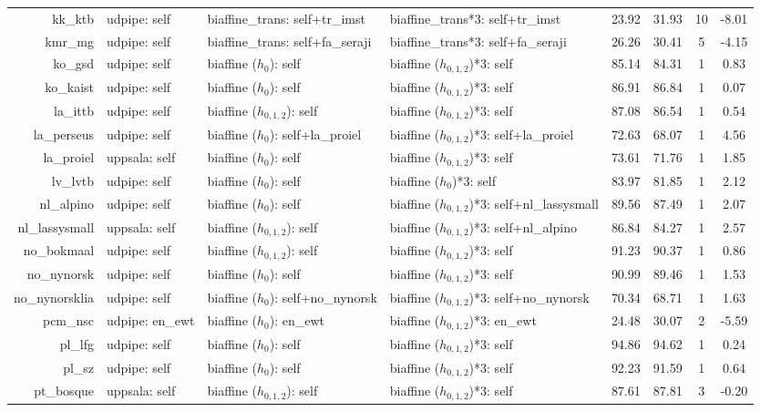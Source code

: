 \documentclass[11pt,a4paper]{article}
\begin{document}
\begin{table}[t]
\begin{tabular}{rlllcccc}
kk\_ktb & udpipe: self & biaffine\_trans: self+tr\_imst & biaffine\_trans*3: self+tr\_imst & 23.92 & 31.93 & 10 & -8.01 \\
kmr\_mg & udpipe: self & biaffine\_trans: self+fa\_seraji & biaffine\_trans*3: self+fa\_seraji & 26.26 & 30.41 & 5 & -4.15 \\
ko\_gsd & udpipe: self & biaffine ($h_{0}$): self & biaffine ($h_{0,1,2}$)*3: self & 85.14 & 84.31 & 1 & 0.83 \\
ko\_kaist & udpipe: self & biaffine ($h_{0}$): self & biaffine ($h_{0,1,2}$)*3: self & 86.91 & 86.84 & 1 & 0.07 \\
la\_ittb & udpipe: self & biaffine ($h_{0,1,2}$): self & biaffine ($h_{0,1,2}$)*3: self & 87.08 & 86.54 & 1 & 0.54 \\
la\_perseus & udpipe: self & biaffine ($h_{0}$): self+la\_proiel & biaffine ($h_{0,1,2}$)*3: self+la\_proiel & 72.63 & 68.07 & 1 & 4.56 \\
la\_proiel & uppsala: self & biaffine ($h_{0}$): self & biaffine ($h_{0,1,2}$)*3: self & 73.61 & 71.76 & 1 & 1.85 \\
lv\_lvtb & udpipe: self & biaffine ($h_{0}$): self & biaffine ($h_{0}$)*3: self & 83.97 & 81.85 & 1 & 2.12 \\
nl\_alpino & udpipe: self & biaffine ($h_{0}$): self & biaffine ($h_{0,1,2}$)*3: self+nl\_lassysmall & 89.56 & 87.49 & 1 & 2.07 \\
nl\_lassysmall & uppsala: self & biaffine ($h_{0,1,2}$): self & biaffine ($h_{0,1,2}$)*3: self+nl\_alpino & 86.84 & 84.27 & 1 & 2.57 \\
no\_bokmaal & udpipe: self & biaffine ($h_{0,1,2}$): self & biaffine ($h_{0,1,2}$)*3: self & 91.23 & 90.37 & 1 & 0.86 \\
no\_nynorsk & udpipe: self & biaffine ($h_{0}$): self & biaffine ($h_{0,1,2}$)*3: self & 90.99 & 89.46 & 1 & 1.53 \\
no\_nynorsklia & udpipe: self & biaffine ($h_{0}$): self+no\_nynorsk & biaffine ($h_{0,1,2}$)*3: self+no\_nynorsk & 70.34 & 68.71 & 1 & 1.63 \\
pcm\_nsc & udpipe: en\_ewt & biaffine ($h_{0}$): en\_ewt & biaffine ($h_{0,1,2}$)*3: en\_ewt & 24.48 & 30.07 & 2 & -5.59 \\
pl\_lfg & udpipe: self & biaffine ($h_{0}$): self & biaffine ($h_{0,1,2}$)*3: self & 94.86 & 94.62 & 1 & 0.24 \\
pl\_sz & udpipe: self & biaffine ($h_{0}$): self & biaffine ($h_{0,1,2}$)*3: self & 92.23 & 91.59 & 1 & 0.64 \\
pt\_bosque & uppsala: self & biaffine ($h_{0,1,2}$): self & biaffine ($h_{0,1,2}$)*3: self & 87.61 & 87.81 & 3 & -0.20 \\

\end{tabular}
\end{table}
\end{document}
